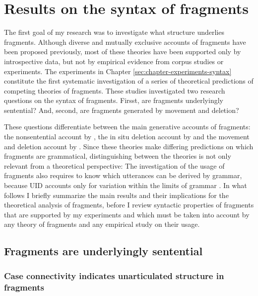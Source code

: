 \section{Results on the syntax of fragments}
The first goal of my research was to investigate what structure underlies fragments. Although diverse and mutually exclusive accounts of fragments have been proposed previously, most of these theories have been supported only by introspective data, but not by empirical evidence from corpus studies or experiments. The experiments in Chapter \ref{sec:chapter-experiments-syntax} constitute the first systematic investigation of a series of theoretical predictions of competing theories of fragments. These studies investigated two research questions on the syntax of fragments. Firsst, are fragments underlyingly sentential? And, second, are fragments generated by movement and deletion?

These questions differentiate between the main generative accounts of fragments: the nonsentential account by \citet{barton.progovac2005}, the in situ deletion account by \citet{reich2007} and the movement and deletion account by \citet{merchant2004}. Since these theories make differing predictions on which fragments are grammatical, distinguishing between the theories is not only relevant from a theoretical perspective: The investigation of the usage of fragments also requires to know which utterances can be derived by grammar, because UID accounts only for variation within the limits of grammar \citep{jaeger2010}. In what follows I briefly summarize the main results and their implications for the theoretical analysis of fragments, before I review syntactic properties of fragments that are supported by my experiments and which must be taken into account by any theory of fragments and any empirical study on their usage.

\subsection{Fragments are underlyingly sentential}
\subsubsection{Case connectivity indicates unarticulated structure in fragments}

